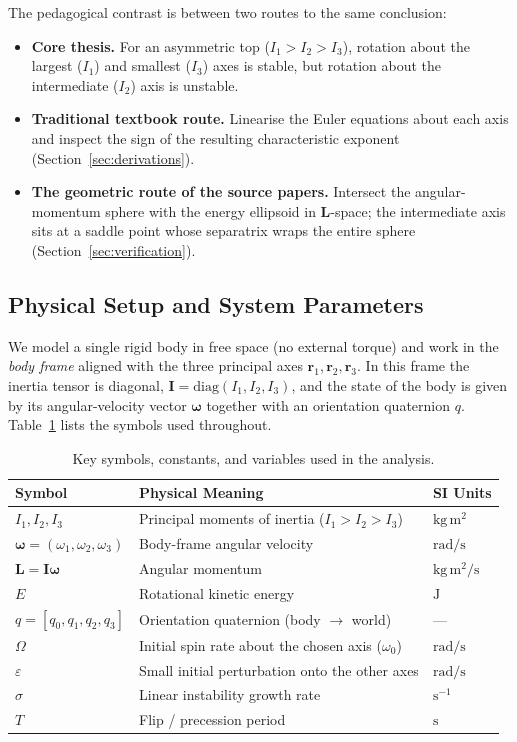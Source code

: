 \documentclass[11pt,letterpaper]{article}
\begin{document}
The pedagogical contrast is between two routes to the same conclusion:
\begin{itemize}
\item \textbf{Core thesis.} For an asymmetric top ($I_1 > I_2 > I_3$), rotation
about the largest ($I_1$) and smallest ($I_3$) axes is stable, but rotation
about the intermediate ($I_2$) axis is unstable.
\item \textbf{Traditional textbook route.} Linearise the Euler equations about
each axis and inspect the sign of the resulting characteristic exponent
(Section~\ref{sec:derivations}).
\item \textbf{The geometric route of the source papers.} Intersect the
angular-momentum sphere with the energy ellipsoid in $\mathbf{L}$-space; the
intermediate axis sits at a saddle point whose separatrix wraps the entire
sphere (Section~\ref{sec:verification}).
\end{itemize}

\subsection{Physical Setup and System Parameters}
We model a single rigid body in free space (no external torque) and work in the
\emph{body frame} aligned with the three principal axes
$\mathbf{r}_1, \mathbf{r}_2, \mathbf{r}_3$. In this frame the inertia tensor is
diagonal, $\mathbf{I} = \mathrm{diag}(I_1, I_2, I_3)$, and the state of the body
is given by its angular-velocity vector $\boldsymbol{\omega}$ together with an
orientation quaternion $q$. Table~\ref{tab:variables} lists the symbols used
throughout.

\begin{table}[h!]
\centering
\caption{Key symbols, constants, and variables used in the analysis.}
\label{tab:variables}
\begin{tabular}{lll}
\toprule
\textbf{Symbol} & \textbf{Physical Meaning} & \textbf{SI Units} \\
\midrule
$I_1, I_2, I_3$ & Principal moments of inertia ($I_1\!>\!I_2\!>\!I_3$) & $\mathrm{kg\,m^2}$ \\
$\boldsymbol{\omega}=(\omega_1,\omega_2,\omega_3)$ & Body-frame angular velocity & $\mathrm{rad/s}$ \\
$\mathbf{L}=\mathbf{I}\boldsymbol{\omega}$ & Angular momentum & $\mathrm{kg\,m^2/s}$ \\
$E$ & Rotational kinetic energy & $\mathrm{J}$ \\
$q=[q_0,q_1,q_2,q_3]$ & Orientation quaternion (body $\to$ world) & --- \\
$\Omega$ & Initial spin rate about the chosen axis ($\omega_0$) & $\mathrm{rad/s}$ \\
$\varepsilon$ & Small initial perturbation onto the other axes & $\mathrm{rad/s}$ \\
$\sigma$ & Linear instability growth rate & $\mathrm{s^{-1}}$ \\
$T$ & Flip / precession period & $\mathrm{s}$ \\
\bottomrule
\end{tabular}
\end{table}
\end{document}
